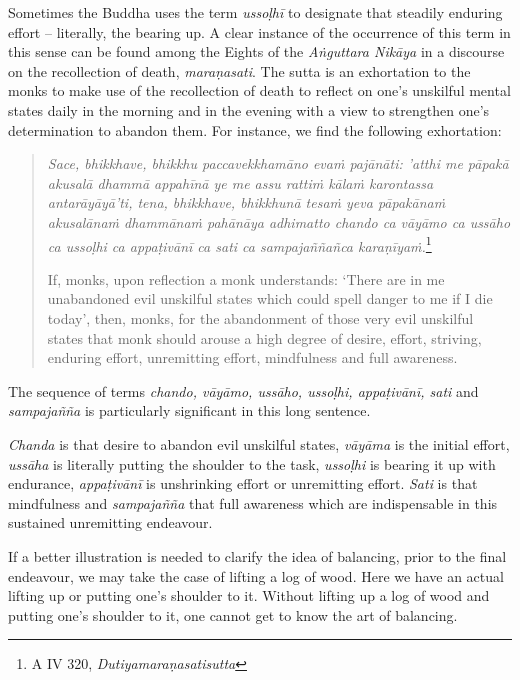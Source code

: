 \enlargethispage{\baselineskip}

Sometimes the Buddha uses the term \emph{ussoḷhī} to designate that steadily enduring effort -- literally, the bearing up. A clear instance of the occurrence of this term in this sense can be found among the Eights of the \emph{Aṅguttara Nikāya} in a discourse on the recollection of death, \emph{maraṇasati}. The sutta is an exhortation to the monks to make use of the recollection of death to reflect on one's unskilful mental states daily in the morning and in the evening with a view to strengthen one's determination to abandon them. For instance, we find the following exhortation:

\begin{quote}
\emph{Sace, bhikkhave, bhikkhu paccavekkhamāno evaṁ pajānāti: 'atthi me pāpakā akusalā dhammā appahīnā ye me assu rattiṁ kālaṁ karontassa antarāyāyā'ti, tena, bhikkhave, bhikkhunā tesaṁ yeva pāpakānaṁ akusalānaṁ dhammānaṁ pahānāya adhimatto chando ca vāyāmo ca ussāho ca ussoḷhi ca appaṭivānī ca sati ca sampajaññañca karaṇīyaṁ.}\footnote{A IV 320, \emph{Dutiyamaraṇasatisutta}}

If, monks, upon reflection a monk understands: `There are in me unabandoned evil unskilful states which could spell danger to me if I die today', then, monks, for the abandonment of those very evil unskilful states that monk should arouse a high degree of desire, effort, striving, enduring effort, unremitting effort, mindfulness and full awareness.
\end{quote}

The sequence of terms \emph{chando, vāyāmo, ussāho, ussoḷhi, appaṭivānī, sati} and \emph{sampajañña} is particularly significant in this long sentence.

\emph{Chanda} is that desire to abandon evil unskilful states, \emph{vāyāma} is the initial effort, \emph{ussāha} is literally putting the shoulder to the task, \emph{ussoḷhi} is bearing it up with endurance, \emph{appaṭivānī} is unshrinking effort or unremitting effort. \emph{Sati} is that mindfulness and \emph{sampajañña} that full awareness which are indispensable in this sustained unremitting endeavour.

If a better illustration is needed to clarify the idea of balancing, prior to the final endeavour, we may take the case of lifting a log of wood. Here we have an actual lifting up or putting one's shoulder to it. Without lifting up a log of wood and putting one's shoulder to it, one cannot get to know the art of balancing.


